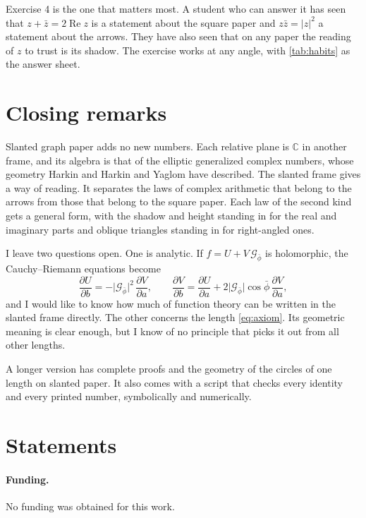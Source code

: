 \documentclass[11pt,a4paper]{article}
\theoremstyle{plain}
\theoremstyle{definition}
\newcommand{\pb}{\bar{\phi}}                     %
\newcommand{\Gp}{\mathcal{G}_{\bar{\phi}}}       %
\newcommand{\C}{\mathbb{C}}
\newcommand{\G}{\lvert\Gp\rvert}                 %
\renewcommand{\Re}{\operatorname{Re}}
\begin{document}
Exercise 4 is the one that matters most. A student who can answer it has seen that $z + \bar z = 2\Re z$ is a statement about the square paper and $z\bar z = \lvert z\rvert^2$ a statement about the arrows. They have also seen that on any paper the reading of $z$ to trust is its shadow. The exercise works at any angle, with \cref{tab:habits} as the answer sheet.

\section{Closing remarks}

Slanted graph paper adds no new numbers. Each relative plane is $\C$ in another frame, and its algebra is that of the elliptic generalized complex numbers, whose geometry Harkin and Harkin \cite{HarkinHarkin} and Yaglom \cite{Yaglom} have described. The slanted frame gives a way of reading. It separates the laws of complex arithmetic that belong to the arrows from those that belong to the square paper. Each law of the second kind gets a general form, with the shadow and height standing in for the real and imaginary parts and oblique triangles standing in for right-angled ones.

I leave two questions open. One is analytic. If $f = U + V\,\Gp$ is holomorphic, the Cauchy--Riemann equations become
\[
\frac{\partial U}{\partial b} = -\G^2\,\frac{\partial V}{\partial a} , \qquad \frac{\partial V}{\partial b} = \frac{\partial U}{\partial a} + 2\G\cos\pb\,\frac{\partial V}{\partial a} ,
\]
and I would like to know how much of function theory can be written in the slanted frame directly. The other concerns the length \eqref{eq:axiom}. Its geometric meaning is clear enough, but I know of no principle that picks it out from all other lengths.

A longer version \cite{DerrazGN} has complete proofs and the geometry of the circles of one length on slanted paper. It also comes with a script that checks every identity and every printed number, symbolically and numerically.




\section*{Statements}

\paragraph{Funding.} No funding was obtained for this work.
\end{document}
